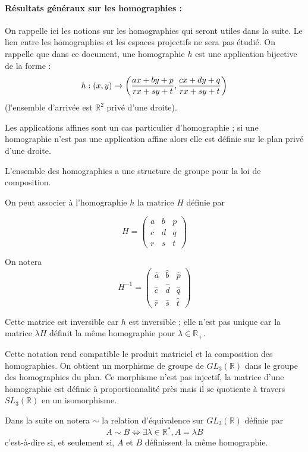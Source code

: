 \paragraph{Résultats généraux sur les homographies :}
 On rappelle ici les notions sur les homographies qui seront utiles dans la suite. Le lien entre les homographies et les espaces projectifs ne sera pas étudié. On rappelle que dans ce document, une homographie $h$ est une application bijective de la forme :
	\[h:(x,y)\rightarrow \left(\frac{ax+by+p}{rx+sy+t},\frac{cx+dy+q}{rx+sy+t}\right)\]
(l'ensemble d'arrivée est $\mathbb R^2$ privé d'une droite).

Les applications affines sont un cas particulier d'homographie ; si une homographie n'est pas une application affine alors elle est définie sur le plan privé d'une droite.

L'ensemble des homographies a une structure de groupe pour la loi de composition.

On peut associer à l'homographie $h$ la matrice $H$ définie par
  
\begin{equation*}
	H=\begin{pmatrix}
	a&b&p\\c&d&q\\r&s&t
	\end{pmatrix}
\end{equation*}
 
 On notera
 \begin{equation*}
 H^{-1}=\begin{pmatrix} \hat a&\hat b&\hat p\\ \hat c&\hat d&\hat q\\ \hat r&\hat s&\hat t \end{pmatrix}
 \end{equation*}

Cette matrice est inversible car $h$ est inversible ; elle n'est pas unique car la matrice $\lambda H$ définit la même homographie pour $\lambda \in \mathbb{R}_+$.

Cette notation rend compatible le produit matriciel et la composition des homographies. On obtient un morphisme de groupe de $GL_{3}(\mathbb{R})$ dans le groupe des homographies du plan. Ce morphisme n'est pas injectif, la matrice d'une homographie est définie à proportionnalité près mais il se quotiente à travers $SL_{3}(\mathbb{R})$ en un isomorphisme.

Dans la suite on notera $\sim$ la relation d'équivalence  sur $GL_{3}(\mathbb{R})$ définie par \[A\sim B \iff \exists \lambda\in \mathbb{R}^{*} , A=\lambda B\] c'est-à-dire si, et seulement si, $A$ et $B$ définissent la même homographie.

